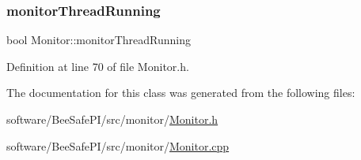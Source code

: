\subsubsection{\texorpdfstring{monitor\+Thread\+Running}{monitorThreadRunning}}
{\footnotesize\ttfamily bool Monitor\+::monitor\+Thread\+Running\hspace{0.3cm}{\ttfamily [private]}}



Definition at line 70 of file Monitor.\+h.



The documentation for this class was generated from the following files\+:\begin{DoxyCompactItemize}
\item 
software/\+Bee\+Safe\+P\+I/src/monitor/\hyperlink{_monitor_8h}{Monitor.\+h}\item 
software/\+Bee\+Safe\+P\+I/src/monitor/\hyperlink{_monitor_8cpp}{Monitor.\+cpp}\end{DoxyCompactItemize}

